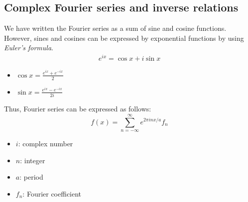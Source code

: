 \subsection{Complex Fourier series and inverse relations}

We have written the Fourier series as a sum of sine and cosine functions. However, sines and cosines can be expressed by exponential functions by using \textit{Euler's formula}. 
\begin{align}
	e^{ix}=\cos x+i\sin x
	\label{eq:euler_formula}
\end{align}
\begin{itemize}
	\item $\cos x=\frac{e^{ix}+e^{-ix}}{2}$
	\item $\sin x=\frac{e^{ix}-e^{-ix}}{2i}$
\end{itemize}
Thus, Fourier series can be expressed as follows:
$$f(x) = \sum_{n=-\infty}^{\infty}e^{2\pi i n x/a}f_n$$
\begin{itemize}
	\item $i$: complex number
	\item $n$: integer
	\item $a$: period
	\item $f_n$: Fourier coefficient
\end{itemize}


